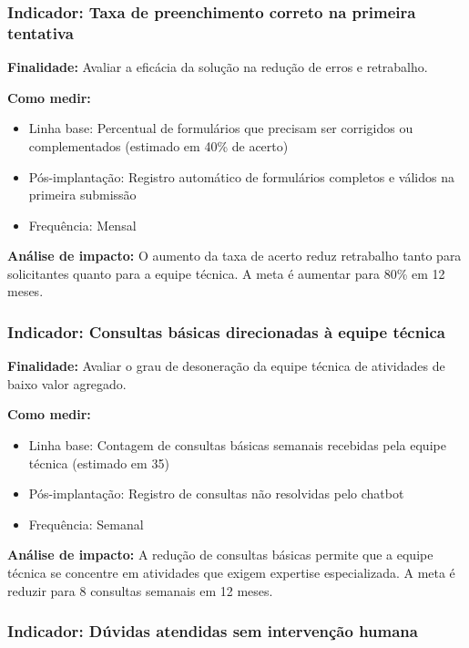 \documentclass[12pt,a4paper]{article}
\begin{document}
\subsubsection{Indicador: Taxa de preenchimento correto na primeira tentativa}

\textbf{Finalidade:} Avaliar a eficácia da solução na redução de erros e retrabalho.

\textbf{Como medir:} 
\begin{itemize}
    \item Linha base: Percentual de formulários que precisam ser corrigidos ou complementados (estimado em 40\% de acerto)
    \item Pós-implantação: Registro automático de formulários completos e válidos na primeira submissão
    \item Frequência: Mensal
\end{itemize}

\textbf{Análise de impacto:} O aumento da taxa de acerto reduz retrabalho tanto para solicitantes quanto para a equipe técnica. A meta é aumentar para 80\% em 12 meses.

\subsubsection{Indicador: Consultas básicas direcionadas à equipe técnica}

\textbf{Finalidade:} Avaliar o grau de desoneração da equipe técnica de atividades de baixo valor agregado.

\textbf{Como medir:} 
\begin{itemize}
    \item Linha base: Contagem de consultas básicas semanais recebidas pela equipe técnica (estimado em 35)
    \item Pós-implantação: Registro de consultas não resolvidas pelo chatbot
    \item Frequência: Semanal
\end{itemize}

\textbf{Análise de impacto:} A redução de consultas básicas permite que a equipe técnica se concentre em atividades que exigem expertise especializada. A meta é reduzir para 8 consultas semanais em 12 meses.

\subsubsection{Indicador: Dúvidas atendidas sem intervenção humana}
\end{document}
